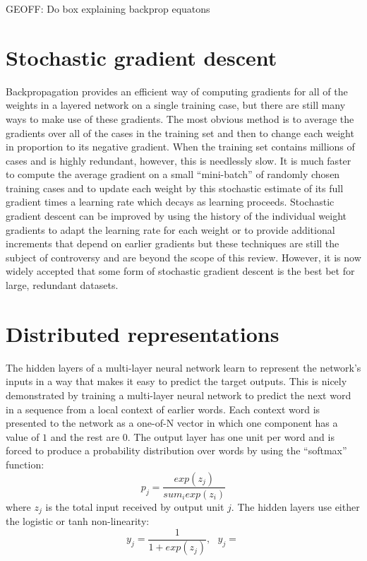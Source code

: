 \documentclass[]{article}
\begin{document}
GEOFF:  Do box explaining backprop equatons

\section{Stochastic gradient descent}

Backpropagation provides an efficient way of computing gradients for all of the weights in a layered network on a
single training case, but there are still many ways to make use of these gradients. The most obvious method is to
average the gradients over all of the cases in the training set and then to change each weight in proportion to its
negative gradient. When the training set contains millions of cases and is highly redundant, however, this is
needlessly slow. It is much faster to compute the average gradient on a small ``mini-batch'' of randomly chosen
training cases and to update each weight by this stochastic estimate of its full gradient times a learning rate which
decays as learning proceeds. Stochastic gradient descent can be improved by using the history of the individual weight
gradients to adapt the learning rate for each weight\cite{bottou-bousquet} or to provide additional increments that
depend on earlier gradients\cite{} but these techniques are still the subject of controversy and are beyond the scope
of this review.  However, it is now widely accepted that some form of stochastic gradient descent is the best bet for
large, redundant datasets.

\section{Distributed representations}

The hidden layers of a multi-layer neural network learn to represent the network's inputs in a way that
makes it easy to predict the target outputs. This is nicely demonstrated by training a multi-layer neural network to
predict the next word in a sequence from a local context of earlier words. Each context word is presented to the network
as a one-of-N vector in which one component has a value of $1$ and the rest are $0$. The output layer has one unit per
word and is forced to produce a probability distribution over words by using the ``softmax'' function:
\begin{equation}
p_j = \frac{exp(z_j)}{sum_i exp(z_i)}
\end{equation}
where $z_j$ is the total input received by output unit $j$. The hidden layers use either the logistic or tanh non-linearity:
\begin{equation}
y_j = \frac{1}{1+ exp(z_j)}, \ \ \ y_j = \frac{}{}
\end{equation}
\end{document}
